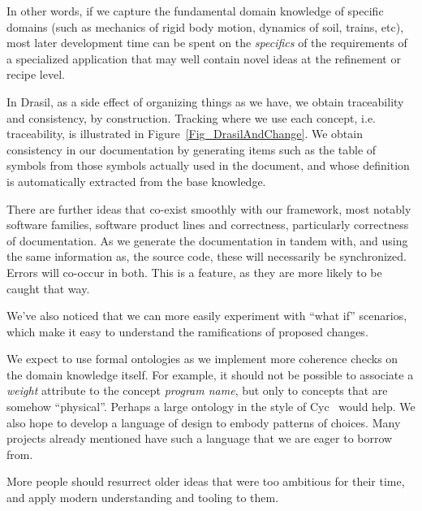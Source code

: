 \documentclass[a4paper,UKenglish,cleveref,autoref,thm-restate]{oasics-v2021}
\begin{document}
In other words, if we capture the fundamental domain knowledge of specific
domains (such as mechanics of rigid body motion, dynamics of soil, trains,
etc), most later development time can be spent on the \emph{specifics} of the
requirements of a specialized application that may well contain novel ideas at
the refinement or recipe level.

In Drasil, as a side effect of organizing things as we have, we obtain
traceability and consistency, by construction.  Tracking where we use each
concept, i.e. traceability, is illustrated in Figure~\ref{Fig_DrasilAndChange}.
We obtain consistency in our documentation by generating items such as the
table of symbols from those symbols actually used in the document, and whose
definition is automatically extracted from the base knowledge.

There are further ideas that co-exist smoothly with our framework, most notably
software families, software product lines and correctness, particularly
correctness of documentation.  As we generate the documentation in tandem with,
and using the same information as, the source code, these will necessarily be
synchronized. Errors will co-occur in both.  This is a feature, as they are
more likely to be caught that way.

We've also noticed that we can more easily experiment with ``what if'' scenarios,
which make it easy to understand the ramifications of proposed changes.  

We expect to use formal ontologies as we implement
more coherence checks on the domain knowledge itself. For example, it should not
be possible to associate a \textit{weight} attribute to the concept
\textit{program name}, but only to concepts that are somehow ``physical''. 
Perhaps a large ontology in the style of Cyc~\cite{lenat1995cyc} would help.
We also hope to develop a language of design to embody patterns of choices.
Many projects already mentioned have such a language that we are eager to
borrow from.

More people should resurrect older ideas that were too ambitious for their
time, and apply modern understanding and tooling to them.



\end{document}
